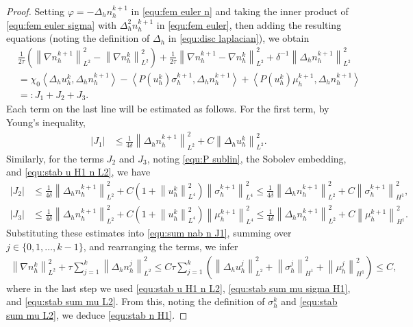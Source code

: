 \documentclass[11pt, reqno]{amsart}
\theoremstyle{definition}
\numberwithin{equation}{section}
\newcommand{\norm}[2]{\left\|{#1}\right\|_{#2}}
\newcommand{\inpro}[2]{\left\langle#1,#2\right\rangle}
\newcommand{\abs}[1]{\left|{#1}\right|}
\begin{document}
\begin{proof}
Setting $\varphi= -\Delta_h n_h^{k+1}$ in \eqref{equ:fem euler n} and taking the inner product of \eqref{equ:fem euler sigma} with $\Delta_h^2 n_h^{k+1}$ in \eqref{equ:fem euler}, then adding the resulting equations (noting the definition of $\Delta_h$ in \eqref{equ:disc laplacian}), we obtain
\begin{align}\label{equ:sum nab n J1}
	&\frac{1}{2\tau} \left(\norm{\nabla n_h^{k+1}}{L^2}^2 - \norm{\nabla n_h^k}{L^2}^2 \right)
	+
	\frac{1}{2\tau} \norm{\nabla n_h^{k+1}-\nabla n_h^k}{L^2}^2
	+
	\delta^{-1} \norm{\Delta_h n_h^{k+1}}{L^2}^2
	\nonumber\\
	&=
	\chi_0 \inpro{\Delta_h u_h^k}{\Delta_h n_h^{k+1}}
	-
	\inpro{P(u_h^k)\sigma_h^{k+1}}{\Delta_h n_h^{k+1}}
	+
	\inpro{P(u_h^k) \mu_h^{k+1}}{\Delta_h n_h^{k+1}}
	\nonumber\\
	&=:J_1+J_2+J_3.
\end{align}
Each term on the last line will be estimated as follows. For the first term, by Young's inequality,
\begin{align*}
	\abs{J_1}
	&\leq
	\frac{1}{4\delta} \norm{\Delta_h n_h^{k+1}}{L^2}^2
	+
	C\norm{\Delta_h u_h^k}{L^2}^2.
\end{align*}
Similarly, for the terms $J_2$ and $J_3$, noting \eqref{equ:P sublin}, the Sobolev embedding, and \eqref{equ:stab u H1 n L2}, we have
\begin{align*}
	\abs{J_2}
	&\leq
	\frac{1}{4\delta} \norm{\Delta_h n_h^{k+1}}{L^2}^2
	+
	C\left(1+\norm{u_h^k}{L^4}^2\right) \norm{\sigma_h^{k+1}}{L^4}^2
	\leq  
	\frac{1}{4\delta} \norm{\Delta_h n_h^{k+1}}{L^2}^2
	+
	C\norm{\sigma_h^{k+1}}{H^1}^2,
	\\
	\abs{J_3}
	&\leq
	\frac{1}{4\delta} \norm{\Delta_h n_h^{k+1}}{L^2}^2
	+
	C\left(1+\norm{u_h^k}{L^4}^2\right) \norm{\mu_h^{k+1}}{L^4}^2
	\leq  
	\frac{1}{4\delta} \norm{\Delta_h n_h^{k+1}}{L^2}^2
	+
	C\norm{\mu_h^{k+1}}{H^1}^2.
\end{align*}
Substituting these estimates into \eqref{equ:sum nab n J1}, summing over $j\in \{0,1,\ldots,k-1\}$, and rearranging the terms, we infer
\begin{align*}
	\norm{\nabla n_h^k}{L^2}^2 + \tau \sum_{j=1}^k \norm{\Delta_h n_h^j}{L^2}^2
	\leq
	C\tau \sum_{j=1}^k \left( \norm{\Delta_h u_h^j}{L^2}^2 + \norm{\sigma_h^j}{H^1}^2 + \norm{\mu_h^j}{H^1}^2 \right)
	\leq
	C,
\end{align*}
where in the last step we used \eqref{equ:stab u H1 n L2}, \eqref{equ:stab sum mu sigma H1}, and \eqref{equ:stab sum mu L2}. From this, noting the definition of $\sigma_h^k$ and \eqref{equ:stab sum mu L2}, we deduce \eqref{equ:stab n H1}.
\end{proof}
\end{document}
